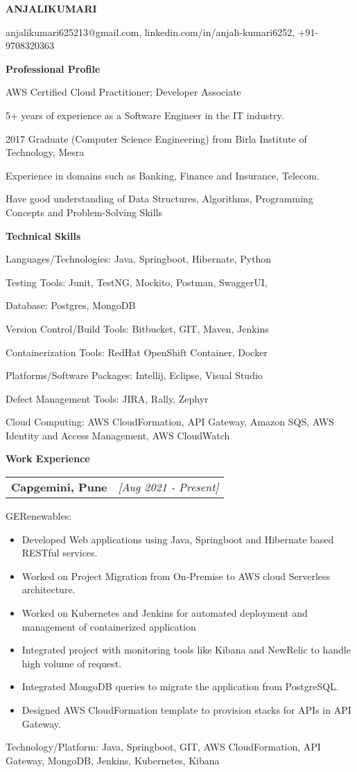 \documentclass[a4paper,10pt]{article}
\makeatletter
\newcommand{\resitem}[1]{\item #1}
\newcommand{\resheading}[1]{\vspace{0.5em} {\small \colorbox{mygrey}{{\begin{minipage}{0.975\textwidth}{{\textbf{#1}}}\end{minipage}}}} \vspace{0.5em}}
\newcommand{\ressubheading}[3]{\begin{tabular*}{6.62in}{l @{\extracolsep{\fill}} r} \textbf{#1} & \textit{[#2]} \\ \end{tabular*}\vspace{-8pt}}
\makeatother
\begin{document}
\begin{center} \Large{\textbf{ANJALIKUMARI}} \end{center}

\vspace{2pt}

\begin{center} anjalikumari625213@gmail.com, linkedin.com/in/anjali-kumari6252, +91-9708320363 \end{center}

\resheading{Professional Profile}
\resitem{AWS Certified Cloud Practitioner; Developer Associate}
\resitem{5+ years of experience as a Software Engineer in the IT industry.}
\resitem{2017 Graduate (Computer Science Engineering) from Birla Institute of Technology, Mesra}
\resitem{Experience in domains such as Banking, Finance and Insurance, Telecom.}
\resitem{Have good understanding of Data Structures, Algorithms, Programming Concepts and Problem-Solving Skills}

\resheading{Technical Skills}
\resitem{Languages/Technologies: Java, Springboot, Hibernate, Python}
\resitem{Testing Tools: Junit, TestNG, Mockito, Postman, SwaggerUI,}
\resitem{Database: Postgres, MongoDB}
\resitem{Version Control/Build Tools: Bitbucket, GIT, Maven, Jenkins}
\resitem{Containerization Tools: RedHat OpenShift Container, Docker}
\resitem{Platforms/Software Packages: Intellij, Eclipse, Visual Studio}
\resitem{Defect Management Tools: JIRA, Rally, Zephyr}
\resitem{Cloud Computing: AWS CloudFormation, API Gateway, Amazon SQS, AWS Identity and Access Management, AWS CloudWatch}

\resheading{Work Experience}
\ressubheading{Capgemini, Pune}{Aug 2021 - Present}{Senior Consultant}
\resitem{GERenewables:}
\begin{itemize}[nosep]
    \item Developed Web applications using Java, Springboot and Hibernate based RESTful services.
    \item Worked on Project Migration from On-Premise to AWS cloud Serverless architecture.
    \item Worked on Kubernetes and Jenkins for automated deployment and management of containerized application
    \item Integrated project with monitoring tools like Kibana and NewRelic to handle high volume of request.
    \item Integrated MongoDB queries to migrate the application from PostgreSQL.
    \item Designed AWS CloudFormation template to provision stacks for APIs in API Gateway.
\end{itemize}
Technology/Platform: Java, Springboot, GIT, AWS CloudFormation, API Gateway, MongoDB, Jenkins, Kubernetes, Kibana
\end{document}
